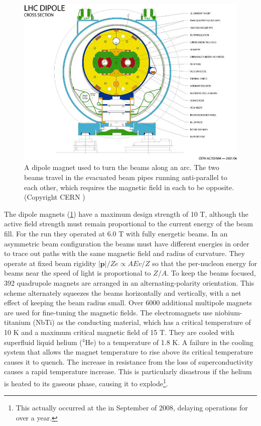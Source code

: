\begin{figure}[t]
\includegraphics{LHC-PHO-2001-187.jpg}
\caption{A dipole magnet used to turn the beams along an arc. The two beams travel in the evacuated beam pipes running anti-parallel to each other, which requires the magnetic field in each to be opposite. (Copyright CERN \cite{Valeriane:843195})}
\label{fig:dipole_cross_section}
\end{figure}

The dipole magnets (\cref{fig:dipole_cross_section}) have a maximum design strength of 10 T, although the active field strength must remain proportional to the current energy of the beam fill.
For the \pPbenergy \pPb run they operated at 6.0 T with fully energetic beams.
In an asymmetric \pA beam configuration the beams must have different energies in order to trace out paths with the same magnetic field and radius of curvature.
They operate at fixed beam rigidity $|\mathbf{p}|/Ze \propto AEv/Z$ so that the per-nucleon energy for beams near the speed of light is proportional to $Z/A$.
To keep the beams focused, 392 quadrupole magnets are arranged in an alternating-polarity orientation.
This scheme alternately squeezes the beams horizontally and vertically, with a net effect of keeping the beam radius small.
Over 6000 additional multipole magnets are used for fine-tuning the magnetic fields.
The electromagnets use niobium-titanium (NbTi) as the conducting material, which has a critical temperature of 10 K and a maximum critical magnetic field of 15 T.
They are cooled with superfluid liquid helium (${}^{4}\textrm{He}$) to a temperature of 1.8 K.
A failure in the cooling system that allows the magnet temperature to rise above its critical temperature causes it to quench.
The increase in resistance from the loss of superconductivity causes a rapid temperature increase.
This is particularly disastrous if the helium is heated to its gaseous phase, causing it to explode\footnote{This actually occurred at the \lhc in September of 2008, delaying operations for over a year.}.



